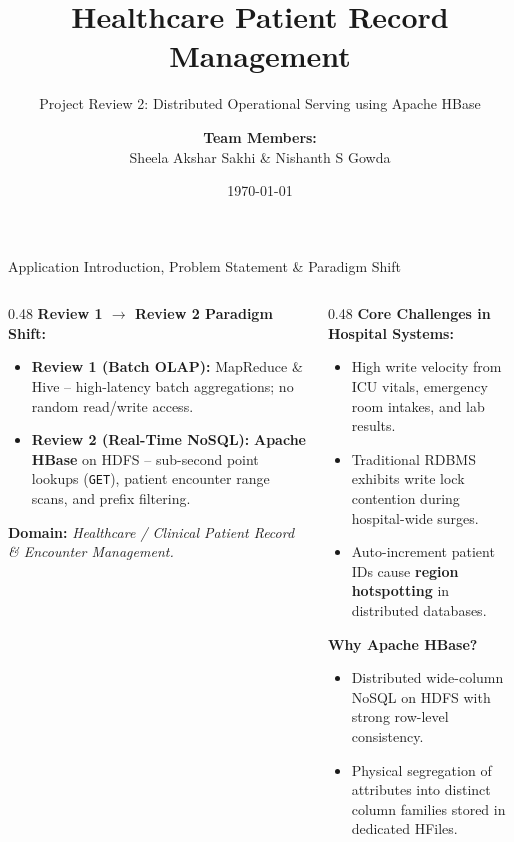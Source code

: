 \documentclass[aspectratio=169]{beamer}
\title{Healthcare Patient Record Management}
\subtitle{Project Review 2: Distributed Operational Serving using Apache HBase}
\author{\textbf{Team Members:}\\ Sheela Akshar Sakhi \quad \& \quad Nishanth S Gowda}
\institute{Department of Computer Science and Engineering\\Amrita Vishwa Vidyapeetham}
\date{\today}
\begin{document}
\begin{frame}[plain]
    \titlepage
\end{frame}

\begin{frame}{Application Introduction, Problem Statement \& Paradigm Shift}
    \begin{columns}[T]
        \begin{column}{0.48\textwidth}
            \textbf{\textcolor{NavyBlue}{Review 1 $\to$ Review 2 Paradigm Shift:}}
            \vspace{0.1cm}
            \begin{itemize}\scriptsize
                \item \textbf{Review 1 (Batch OLAP):} MapReduce \& Hive -- high-latency batch aggregations; no random read/write access.
                \item \textbf{Review 2 (Real-Time NoSQL):} \textbf{Apache HBase} on HDFS -- sub-second point lookups (\texttt{GET}), patient encounter range scans, and prefix filtering.
            \end{itemize}
            \vspace{0.15cm}
            \textbf{\textcolor{NavyBlue}{Domain:}} \textit{Healthcare / Clinical Patient Record \& Encounter Management.}
        \end{column}
        \begin{column}{0.48\textwidth}
            \textbf{\textcolor{AmritaMaroon}{Core Challenges in Hospital Systems:}}
            \vspace{0.1cm}
            \begin{itemize}\scriptsize
                \item High write velocity from ICU vitals, emergency room intakes, and lab results.
                \item Traditional RDBMS exhibits write lock contention during hospital-wide surges.
                \item Auto-increment patient IDs cause \textbf{region hotspotting} in distributed databases.
            \end{itemize}
            \vspace{0.15cm}
            \textbf{\textcolor{AmritaMaroon}{Why Apache HBase?}}
            \begin{itemize}\scriptsize
                \item Distributed wide-column NoSQL on HDFS with strong row-level consistency.
                \item Physical segregation of attributes into distinct column families stored in dedicated HFiles.
            \end{itemize}
        \end{column}
    \end{columns}
\end{frame}
\end{document}
